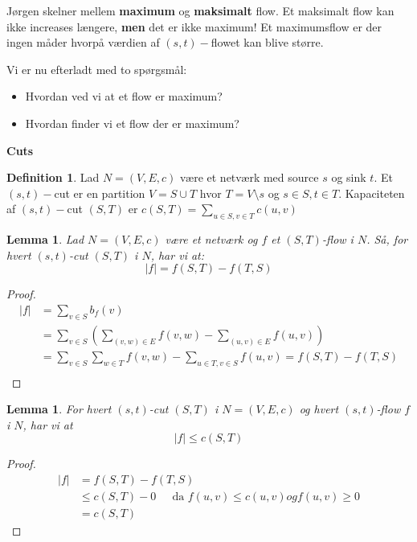 \documentclass[11pt]{article}
\newtheorem{lemma}[theorem]{Lemma}
\theoremstyle{definition}
\newtheorem{definition}{Definition}
\theoremstyle{remark}
\begin{document}
Jørgen skelner mellem \textbf{maximum} og \textbf{maksimalt} flow. Et maksimalt flow kan ikke increases længere, \textbf{men} det er ikke maximum! Et maximumsflow er der ingen måder hvorpå værdien af $(s,t)-$flowet kan blive større.

Vi er nu efterladt med to spørgsmål:
\begin{itemize}
\item Hvordan ved vi at et flow er maximum?
\item Hvordan finder vi et flow der er maximum?
\end{itemize}

\noindent
{\Large \textbf{Cuts}}
\noindent

\begin{definition}
Lad $N = (V,E,c)$ være et netværk med source $s$ og sink $t$. Et $(s,t)-$cut er en partition $V = S \cup T$ hvor $T = V \setminus s$ og $s \in S, t \in T$. Kapaciteten af $(s,t)-$cut $(S,T)$ er $c(S,T) = \sum_{u \in S, v \in T}^{}c(u,v)$
\end{definition}

\begin{lemma}
  Lad $N = (V,E,c)$ være et netværk og $f$ et $(S,T)$-flow i $N$. Så, for hvert $(s,t)$-cut $(S,T)$ i $N$, har vi at:
  \[ |f| = f(S,T) - f(T,S) \]
\end{lemma}

\begin{proof}
\begin{equation}
  \begin{split}
    |f| &= \sum_{v \in S}^{} b_{f}(v)\\
        &= \sum_{v \in S}^{} \left(  \sum_{(v,w) \in E}^{} f(v,w) - \sum_{(u,v) \in E}^{} f(u,v) \right)\\
        &= \sum_{v \in S} \sum_{w \in T} f(v,w) - \sum_{u \in T, v \in S}^{}f(u,v) = f(S,T) - f(T,S)\\
  \end{split}
\end{equation}
\end{proof}

\begin{lemma}
  For hvert $(s,t)$-cut $(S,T)$ i $N = (V,E,c)$ og hvert $(s,t)$-flow $f$ i $N$, har vi at
  \[
|f| \leq c(S,T)
  \]
\end{lemma}

\begin{proof}
\begin{equation*}
  \begin{split}
    |f| &= f(S,T) - f(T,S)\\
    &\leq c(S,T) - 0 \;\;\;\; \text{ da } f(u,v) \leq c(u,v) og f(u,v) \geq 0\\
    &= c(S,T)
  \end{split}
\end{equation*}
\end{proof}
\end{document}

